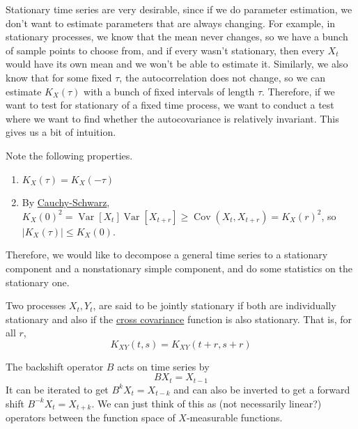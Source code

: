 \documentclass{article}
\DeclareMathOperator{\Cov}{Cov}
\DeclareMathOperator{\Var}{Var}
\begin{document}
  Stationary time series are very desirable, since if we do parameter estimation, we don't want to estimate parameters that are always changing. For example, in stationary processes, we know that the mean never changes, so we have a bunch of sample points to choose from, and if every wasn't stationary, then every $X_t$ would have its own mean and we won't be able to estimate it. Similarly, we also know that for some fixed $\tau$, the autocorrelation does not change, so we can estimate $K_X (\tau)$ with a bunch of fixed intervals of length $\tau$. Therefore, if we want to test for stationary of a fixed time process, we want to conduct a test where we want to find whether the autocovariance is relatively invariant. This gives us a bit of intuition. 

  \begin{theorem}
    \label{thm:properties-of-the-autocovariance-function}
    Note the following properties. 
    \begin{enumerate}
      \item $K_X (\tau) = K_X (- \tau)$ 
      \item By \hyperref[mt-thm:cauchy-schwarz]{Cauchy-Schwarz}, $K_X (0)^2 = \Var[X_t] \Var[X_{t+r}] \geq \Cov(X_t, X_{t+r}) = K_X (r)^2$, so $|K_X (\tau)| \leq K_X (0)$. 
    \end{enumerate}
  \end{theorem}

  Therefore, we would like to decompose a general time series to a stationary component and a nonstationary simple component, and do some statistics on the stationary one. 

  \begin{definition}
    \label{def:joint-stationarity}
    Two processes $X_t, Y_t$, are said to be jointly stationary if both are individually stationary and also if the \hyperref[def:cross-covariance]{cross covariance} function is also stationary. That is, for all $r$, 
    \begin{equation}
      K_{XY} (t, s) = K_{XY}(t + r, s + r)
    \end{equation}
  \end{definition}

  \begin{definition}
    \label{def:backshift-operator}
    The backshift operator $B$ acts on time series by 
    \begin{equation}
      B X_t = X_{t-1}
    \end{equation}
    It can be iterated to get $B^k X_t = X_{t-k}$ and can also be inverted to get a forward shift $B^{-k} X_t  = X_{t+k}$. We can just think of this as (not necessarily linear?) operators between the function space of $X$-measurable functions. 
  \end{definition}
\end{document}
